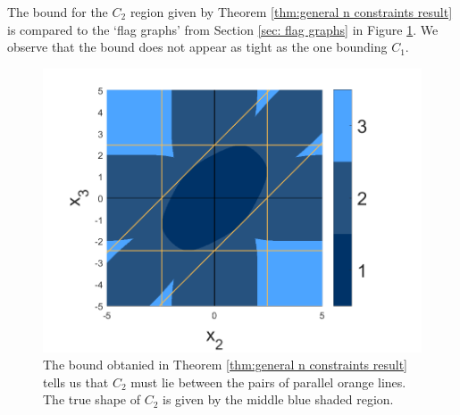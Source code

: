 
		The bound for the $C_2$ region given by Theorem \ref{thm:general n constraints result} is compared to the `flag graphs' from Section \ref{sec: flag graphs} in Figure \ref{fig:flag graph m2 bound}. We observe that the bound does not appear as tight as the one bounding $C_1$.

		\begin{figure}
			\centering
			\includegraphics{Figures/Mixtures/normal_flag_graph_m2_bound.png}
			\caption{The bound obtanied in Theorem \ref{thm:general n constraints result} tells us that $C_2$ must lie between the pairs of parallel orange lines. The true shape of $C_2$ is given by the middle blue shaded region.}
			\label{fig:flag graph m2 bound}
		\end{figure}

